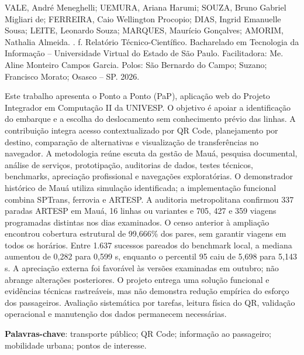\documentclass[12pt,oneside,a4paper,brazil,chapter=TITLE]{abntex2}
\begin{document}
\begin{resumo}
\SingleSpacing
\noindent VALE, André Meneghelli; UEMURA, Ariana Harumi; SOUZA, Bruno Gabriel Migliari de; FERREIRA, Caio Wellington Procopio; DIAS, Ingrid Emanuelle Sousa; LEITE, Leonardo Souza; MARQUES, Maurício Gonçalves; AMORIM, Nathalia Almeida. \textit{\imprimirtitulo}. \ztotpages{} f. Relatório Técnico-Científico. Bacharelado em Tecnologia da Informação -- Universidade Virtual do Estado de São Paulo. Facilitadora: Me. Aline Monteiro Campos Garcia. Polos: São Bernardo do Campo; Suzano; Francisco Morato; Osasco -- SP. 2026.
\par\medskip
Este trabalho apresenta o Ponto a Ponto (PaP), aplicação web do Projeto Integrador em Computação II da UNIVESP. O objetivo é apoiar a identificação do embarque e a escolha do deslocamento sem conhecimento prévio das linhas. A contribuição integra acesso contextualizado por QR Code, planejamento por destino, comparação de alternativas e visualização de transferências no navegador. A metodologia reúne escuta da gestão de Mauá, pesquisa documental, análise de serviços, prototipação, auditorias de dados, testes técnicos, benchmarks, apreciação profissional e navegações exploratórias. O demonstrador histórico de Mauá utiliza simulação identificada; a implementação funcional combina SPTrans, ferrovia e ARTESP. A auditoria metropolitana confirmou 337 paradas ARTESP em Mauá, 16 linhas ou variantes e 705, 427 e 359 viagens programadas distintas nos dias examinados. O censo anterior à ampliação encontrou cobertura estrutural de 99,666\% dos pares, sem garantir viagens em todos os horários. Entre 1.637 sucessos pareados do benchmark local, a mediana aumentou de 0,282 para 0,599 s, enquanto o percentil 95 caiu de 5,698 para 5,143 s. A apreciação externa foi favorável às versões examinadas em outubro; não abrange alterações posteriores. O projeto entrega uma solução funcional e evidências técnicas rastreáveis, mas não demonstra redução empírica do esforço dos passageiros. Avaliação sistemática por tarefas, leitura física do QR, validação operacional e manutenção dos dados permanecem necessárias.
\par\medskip
\textbf{Palavras-chave}: transporte público; QR Code; informação ao passageiro; mobilidade urbana; pontos de interesse.
\end{resumo}
\begingroup
\SingleSpacing
\setlength{\beforechapskip}{0pt}
\setlength{\afterchapskip}{12pt}
\renewcommand{\listfigurename}{Lista de figuras}
\listoffigures*
\clearpage
{}
\listoftables*
\cleardoublepage
\endgroup
\begingroup
\SingleSpacing
\setlength{\beforechapskip}{0pt}
\setlength{\afterchapskip}{6pt}
\setlength{\cftbeforechapterskip}{2pt}
\setpnumwidth{2em}
\setrmarg{3em}
\setlength{\cftbeforesubsectionskip}{-1.8pt}
\tableofcontents*
\endgroup
\cleardoublepage
\end{document}
